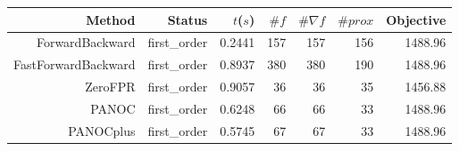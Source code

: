 \begin{tabular}{rrrrrrr}
  \toprule
  \textbf{Method} & \textbf{Status} & \textbf{$t$($s$)} & \textbf{$\#f$} & \textbf{$\#\nabla f$} & \textbf{$\#prox$} & \textbf{Objective} \\
  \midrule
  ForwardBackward & first\_order & 0.2441 & 157 & 157 & 156 & 1488.96 \\
  FastForwardBackward & first\_order & 0.8937 & 380 & 380 & 190 & 1488.96 \\
  ZeroFPR & first\_order & 0.9057 & 36 & 36 & 35 & 1456.88 \\
  PANOC & first\_order & 0.6248 & 66 & 66 & 33 & 1488.96 \\
  PANOCplus & first\_order & 0.5745 & 67 & 67 & 33 & 1488.96 \\
  \bottomrule
\end{tabular}
